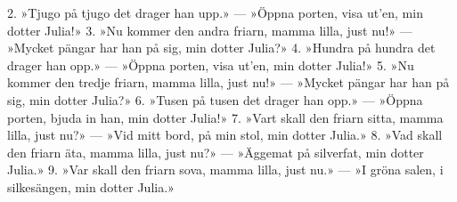 2.  »Tjugo på tjugo det drager han upp.» —
    »Öppna porten, visa ut’en, min dotter Julia!»
3.  »Nu kommer den andra friarn, mamma lilla, just nu!» —
    »Mycket pängar har han på sig, min dotter Julia?»
4.  »Hundra på hundra det drager han opp.» —
    »Öppna porten, visa ut’en, min dotter Julia!»
5.  »Nu kommer den tredje friarn, mamma lilla, just nu!» —
    »Mycket pängar har han på sig, min dotter Julia?»
6.  »Tusen på tusen det drager han opp.» —
    »Öppna porten, bjuda in han, min dotter Julia!»
7.  »Vart skall den friarn sitta, mamma lilla, just nu?» —
    »Vid mitt bord, på min stol, min dotter Julia.»
8.  »Vad skall den friarn äta, mamma lilla, just nu?» —
    »Äggemat på silverfat, min dotter Julia.»
9.  »Var skall den friarn sova, mamma lilla, just nu.» —
    »I gröna salen, i silkesängen, min dotter Julia.»
